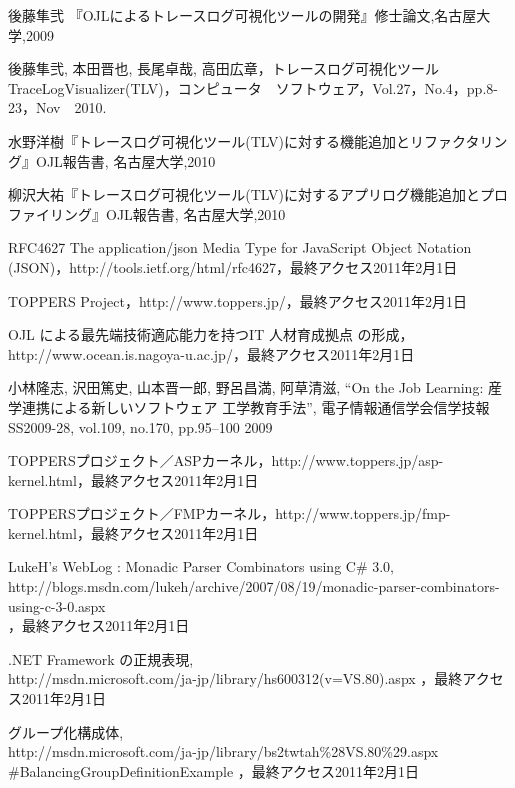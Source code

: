 ﻿\documentclass[12pt,report]{jsbook}
\begin{document}
\begin{thebibliography}{99}%
 後藤隼弐 『OJLによるトレースログ可視化ツールの開発』修士論文,名古屋大学,2009

後藤隼弐,
本田晋也,
長尾卓哉,
高田広章，トレースログ可視化ツールTraceLogVisualizer(TLV)，コンピュータ　ソフトウェア，Vol.27，No.4，pp.8-23，Nov　2010.

 水野洋樹『トレースログ可視化ツール(TLV)に対する機能追加とリファクタリング』OJL報告書,
名古屋大学,2010

 柳沢大祐『トレースログ可視化ツール(TLV)に対するアプリログ機能追加とプロファイリング』OJL報告書,
名古屋大学,2010

RFC4627 The application/json Media Type for JavaScript Object Notation (JSON)，http://tools.ietf.org/html/rfc4627，最終アクセス2011年2月1日

TOPPERS Project，http://www.toppers.jp/，最終アクセス2011年2月1日

 OJL による最先端技術適応能力を持つIT 人材育成拠点
の形成，http://www.ocean.is.nagoya-u.ac.jp/，最終アクセス2011年2月1日

 小林隆志, 沢田篤史, 山本晋一郎, 野呂昌満, 阿草清滋, “On
the Job Learning: 産学連携による新しいソフトウェア
工学教育手法”,  電子情報通信学会信学技報SS2009-28,
vol.109, no.170, pp.95–100 2009

 TOPPERSプロジェクト／ASPカーネル，http://www.toppers.jp/asp-kernel.html，最終アクセス2011年2月1日

 TOPPERSプロジェクト／FMPカーネル，http://www.toppers.jp/fmp-kernel.html，最終アクセス2011年2月1日

LukeH's WebLog : Monadic Parser Combinators using C\# 3.0,\\
http://blogs.msdn.com/lukeh/archive/2007/08/19/monadic-parser-combinators-using-c-3-0.aspx\\
，最終アクセス2011年2月1日

.NET Framework の正規表現,\\
http://msdn.microsoft.com/ja-jp/library/hs600312(v=VS.80).aspx
，最終アクセス2011年2月1日

グループ化構成体,\\
http://msdn.microsoft.com/ja-jp/library/bs2twtah\%28VS.80\%29.aspx\\
\#BalancingGroupDefinitionExample
，最終アクセス2011年2月1日



\end{thebibliography}
\end{document}
